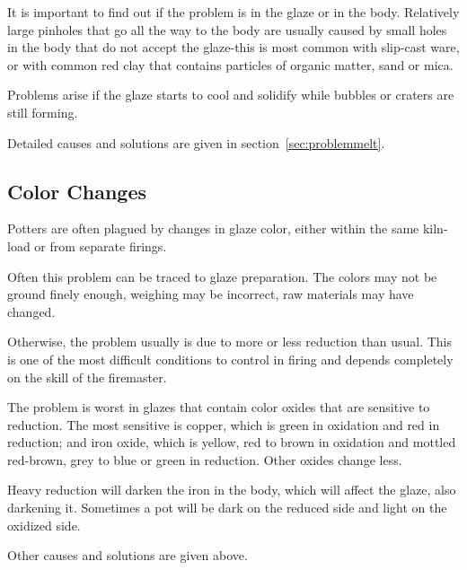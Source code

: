 It is important to find out if the problem is in the glaze or in the body. 
Relatively large pinholes that go all the way to the body are usually caused by 
small holes in the body that do not accept the glaze-this is most common with 
slip-cast ware, or with common red clay that contains particles of organic 
matter, sand or mica.

Problems arise if the glaze starts to cool and solidify while bubbles or 
craters are still forming.

Detailed causes and solutions are given in section~\ref{sec:problemmelt}.
\subsection{Color Changes}
Potters are often plagued by changes in glaze color, either within the same 
kiln-load or from separate firings.

Often this problem can be traced to glaze preparation. The colors may not be 
ground finely enough, weighing may be incorrect, raw materials may have changed.

Otherwise, the problem usually is due to more or less reduction than usual. 
This is one of the most difficult conditions to control in firing and depends 
completely on the skill of the firemaster.

The problem is worst in glazes that contain color oxides that are sensitive to 
reduction. The most sensitive is copper, which is green in oxidation and red in 
reduction; and iron oxide, which is yellow, red to brown in oxidation and 
mottled red-brown, grey to blue or green in reduction. Other oxides change less.

Heavy reduction will darken the iron in the body, which will affect the glaze, 
also darkening it. Sometimes a pot will be dark on the reduced side and light 
on the oxidized side.

Other causes and solutions are given above.
